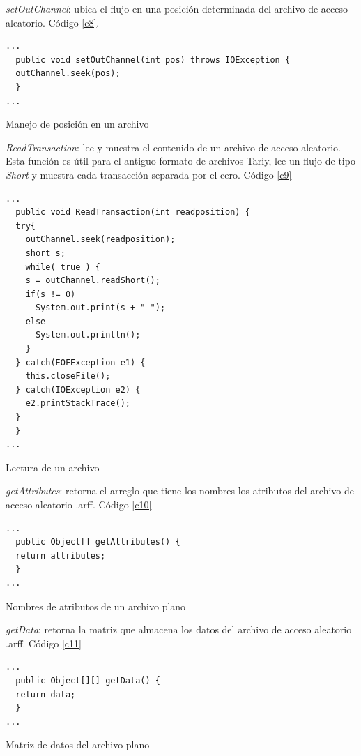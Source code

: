  \textit{setOutChannel}: ubica el flujo en una posici\'on determinada del archivo de acceso aleatorio.
C\'odigo \ref{c8}.\\

\begin{codigof}[t]
\begin{verbatim}
...
  public void setOutChannel(int pos) throws IOException {
  outChannel.seek(pos);
  }
...
\end{verbatim}
\caption{Manejo de posici\'on en un archivo}
\label{c8}
\end{codigof}

\textit{ReadTransaction}: lee y muestra el contenido de un archivo de acceso aleatorio. Esta funci\'on
es \'util para el antiguo formato de archivos Tariy, lee un flujo de tipo \textit{Short }y muestra cada
transacci\'on separada por el cero. C\'odigo \ref{c9}\\

\begin{codigof}[!h]
\begin{verbatim}
...
  public void ReadTransaction(int readposition) {
  try{
    outChannel.seek(readposition);
    short s;
    while( true ) {
    s = outChannel.readShort();
    if(s != 0)
      System.out.print(s + " ");
    else
      System.out.println();
    }
  } catch(EOFException e1) {
    this.closeFile();
  } catch(IOException e2) {
    e2.printStackTrace();
  }
  }
...
\end{verbatim}
\caption{Lectura de un archivo}
\label{c9}
\end{codigof}

\textit{getAttributes}: retorna el arreglo que tiene los nombres los atributos del archivo de acceso
aleatorio .arff. C\'odigo \ref{c10} \\

\begin{codigof}[!h]
\begin{verbatim}
...
  public Object[] getAttributes() {
  return attributes;
  }
...
\end{verbatim}
\caption{Nombres de atributos de un archivo plano}
\label{c10}
\end{codigof}

\textit{getData}: retorna la matriz que almacena los datos del archivo de acceso aleatorio .arff. C\'odigo
\ref{c11} \\

\begin{codigof}[t]
\begin{verbatim}
...
  public Object[][] getData() {
  return data;
  }
...
\end{verbatim}
\caption{Matriz de datos del archivo plano}
\label{c11}
\end{codigof}

